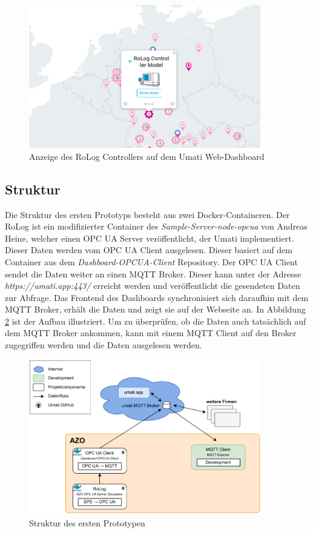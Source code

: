 \documentclass[a4paper, 12pt, oneside, toc=listofnumbered, bibliography=totoc]{scrbook}
\begin{document}
		\begin{figure}[H]
			\centering
			\includegraphics[width=0.9\textwidth]{res/UmatiApp.png}
			\caption{Anzeige des RoLog Controllers auf dem Umati Web-Dashboard}
			\label{fig:umatiApp}
		\end{figure}
		
		\subsection{Struktur}
		
		Die Struktur des ersten Prototyps besteht aus zwei Docker-Containeren. Der RoLog ist ein modifizierter Container des \textit{Sample-Server-node-opcua} von Andreas Heine, welcher einen OPC UA Server veröffentlicht, der Umati implementiert. Dieser Daten werden vom OPC UA Client ausgelesen. Dieser basiert auf dem Container aus dem \textit{Dashboard-OPCUA-Client} Repository. Der OPC UA Client sendet die Daten weiter an einen MQTT Broker. Dieser kann unter der Adresse \textit{https://umati.app:443/} erreicht werden und veröffentlicht die gesendeten Daten zur Abfrage. Das Frontend des Dashboards synchronisiert sich daraufhin mit dem MQTT Broker, erhält die Daten und zeigt sie auf der Webseite an. In Abbildung \ref{fig:Prototyp1} ist der Aufbau illustriert. Um zu überprüfen, ob die Daten auch tatsächlich auf dem MQTT Broker ankommen, kann mit einem MQTT Client auf den Broker zugegriffen werden und die Daten ausgelesen werden.
		
		\begin{figure}[H]
			\centering
			\includegraphics[width=0.9\textwidth]{res/implementierung/Prototyp-umatiWeb.pdf}
			\caption{Struktur des ersten Prototypen}
			\label{fig:Prototyp1}
		\end{figure}
		
\end{document}
